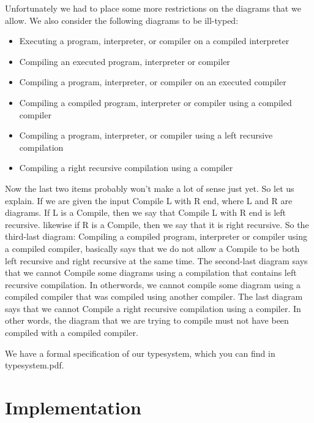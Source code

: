 \documentclass{article}
\begin{document}
Unfortunately we had to place some more restrictions on the diagrams that we allow. We also consider the following diagrams to be ill-typed:

\begin{itemize}
	\item Executing a program, interpreter, or compiler on a compiled interpreter
	\item Compiling an executed program, interpreter or compiler
	\item Compiling a program, interpreter, or compiler on an executed compiler
	\item Compiling a compiled program, interpreter or compiler using a compiled compiler
	\item Compiling a program, interpreter, or compiler using a left recursive compilation
	\item Compiling a right recursive compilation using a compiler
\end{itemize}

Now the last two items probably won't make a lot of sense just yet. So let us explain. If we are given the input Compile L with R end,
where L and R are diagrams. If L is a Compile, then we say that Compile L with R end is left recursive. likewise if R is a Compile, then we say that it is right recursive.
So the third-last diagram: Compiling a compiled program, interpreter or compiler using a compiled compiler, basically says that we do not allow a Compile to be both left recursive and right recursive at the same time. The second-last diagram says that we cannot Compile some diagrams using a compilation that contains left recursive compilation. In otherwords, we cannot compile some diagram using a compiled compiler that was compiled using another compiler. The last diagram says that we cannot Compile a right recursive compilation using a compiler.
In other words, the diagram that we are trying to compile must not have been compiled with a compiled compiler.

\hfill \break

We have a formal specification of our typesystem, which you can find in typesystem.pdf.

\section{Implementation}
\end{document}
